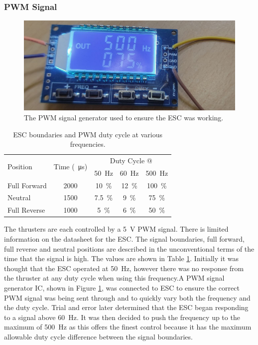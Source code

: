	\subsubsection{PWM Signal}
	\begin{figure}[!hb]
		\begin{center}
			\includegraphics[width=0.31\linewidth]{figures/pwmGen.jpg}
			\caption{The PWM signal generator used to ensure the ESC was working.}
			\label{fig:3:PWMgen}
		\end{center}
	\end{figure}
	\begin{table}[!ht]
		\begin{center}
			\caption{ESC boundaries and PWM duty cycle at various frequencies.}
			\label{tab:3:PWM}
			\begin{tabular}{|l|c|c|c|c|}
				\hline
				\multirow{2}{*}{Position} & \multirow{2}{*}{Time (\SI{}{\micro\second})} & \multicolumn{3}{c|}{Duty Cycle @}\\
				& & \multicolumn{1}{c}{\SI{50}{\hertz}} & \multicolumn{1}{c}{\SI{60}{\hertz}} & \multicolumn{1}{c|}{\SI{500}{\hertz}}\\
				\hline
				Full Forward & 2000 & \SI{10}{\percent} & \SI{12}{\percent} & \SI{100}{\percent}  \\
				\hline
				Neutral & 1500 & \SI{7.5}{\percent} & \SI{9}{\percent} & \SI{75}{\percent}  \\
				\hline
				Full Reverse & 1000 & \SI{5}{\percent} & \SI{6}{\percent} & \SI{50}{\percent}  \\
				\hline
			\end{tabular}
		\end{center}
	\end{table}
	The thrusters are each controlled by a \SI{5}{\volt} PWM signal. There is limited information on the datasheet for the ESC. The signal boundaries, full forward, full reverse and neutral positions are described in the unconventional terms of the time that the signal is high. The values are shown in Table \ref{tab:3:PWM}. Initially it was thought that the ESC operated at \SI{50}{\hertz}, however there was no response from the thruster at any duty cycle when using this frequency.A PWM signal generator IC, shown in Figure \ref{fig:3:PWMgen}, was connected to ESC to ensure  the correct PWM signal was being sent through and to quickly vary both the frequency and the duty cycle.  Trial and error later determined that the ESC began responding to a signal above \SI{60}{\hertz}. It was then decided to push the frequency up to the maximum of \SI{500}{\hertz} as this offers the finest control because it has the maximum allowable duty cycle difference between the signal boundaries.\par
